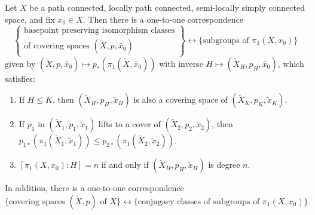 \begin{theorem}
  Let $X$ be a path connected, locally path connected,
  semi-locally simply connected space, and fix $x_0 \in X$.
  Then there is a one-to-one correspondence
  \[
  \left\{\substack{\displaystyle\text{basepoint preserving isomorphism classes} \\ \displaystyle\text{of covering spaces $(\widetilde{X}, p, \widetilde{x_0})$}}\right\}
    \longleftrightarrow
    \{\text{subgroups of $\pi_1(X, x_0)$}\}
  \]
  given by $(\widetilde{X}, p, \widetilde{x_0}) \mapsto p_*(\pi_1(\widetilde{X}, \widetilde{x_0}))$
  with inverse $H \mapsto (\widetilde{X}_H, p_H, \widetilde{x_0})$, which
  satisfies:
  \begin{enumerate}
    \item If $H \le K$, then $(\widetilde{X}_H, p_H, \widetilde{x}_H)$ is also
      a covering space of $(\widetilde{X}_K, p_K, \widetilde{x}_K)$.
    \item If $p_1$ in $(\widetilde{X}_1, p_1, \widetilde{x}_1)$
      lifts to a cover of $(\widetilde{X}_2, p_2, \widetilde{x}_2)$,
      then $p_{1 *}(\pi_1(\widetilde{X}_1, \widetilde{x}_1)) \le p_{2 *}(\pi_1(\widetilde{X}_2, \widetilde{x}_2))$.
    \item
      $[\pi_1(X, x_0) : H] = n$ if and only if
      $(\widetilde{X}_H, p_H, \widetilde{x}_H)$ is degree $n$.
  \end{enumerate}
  In addition, there is a one-to-one correspondence
  \[
    \{\text{covering spaces $(\widetilde{X}, p)$ of $X$}\}
    \longleftrightarrow \{\text{conjugacy classes of subgroups of $\pi_1(X, x_0)$}\}.
  \]
\end{theorem}

